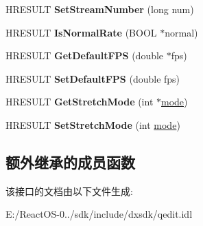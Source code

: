 \begin{DoxyCompactItemize}
H\+R\+E\+S\+U\+LT {\bfseries Set\+Stream\+Number} (long num)
\item 
\mbox{\label{interface_i_a_m_timeline_src_abb4785a07a969c2c744574486f07351d}} 
H\+R\+E\+S\+U\+LT {\bfseries Is\+Normal\+Rate} (B\+O\+OL $\ast$normal)
\item 
\mbox{\label{interface_i_a_m_timeline_src_af20b097855a6471e21e045d5d2a7cfd0}} 
H\+R\+E\+S\+U\+LT {\bfseries Get\+Default\+F\+PS} (double $\ast$fps)
\item 
\mbox{\label{interface_i_a_m_timeline_src_a6f5f29af09da69f82d38925369d05ad6}} 
H\+R\+E\+S\+U\+LT {\bfseries Set\+Default\+F\+PS} (double fps)
\item 
\mbox{\label{interface_i_a_m_timeline_src_a7abfddaab8d77b35d04caad434cdebab}} 
H\+R\+E\+S\+U\+LT {\bfseries Get\+Stretch\+Mode} (int $\ast$\hyperlink{interfacevoid}{mode})
\item 
\mbox{\label{interface_i_a_m_timeline_src_aebed634171a47e73e320a0ec5fc3d553}} 
H\+R\+E\+S\+U\+LT {\bfseries Set\+Stretch\+Mode} (int \hyperlink{interfacevoid}{mode})
\end{DoxyCompactItemize}
\subsection*{额外继承的成员函数}


该接口的文档由以下文件生成\+:\begin{DoxyCompactItemize}
\item 
E\+:/\+React\+O\+S-\/0../sdk/include/dxsdk/qedit.\+idl\end{DoxyCompactItemize}

